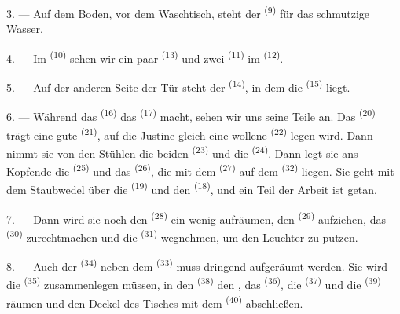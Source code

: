 3. --- Auf dem Boden, vor dem Waschtisch, steht der 
\textsuperscript{(9)} für das schmutzige Wasser.

4. --- Im  \textsuperscript{(10)} sehen wir ein paar
 \textsuperscript{(13)} und zwei 
\textsuperscript{(11)} im  \textsuperscript{(12)}.

5. --- Auf der anderen Seite der Tür steht der 
\textsuperscript{(14)}, in dem die  \textsuperscript{(15)} liegt.

6. --- Während das  \textsuperscript{(16)} das 
\textsuperscript{(17)} macht, sehen wir uns seine Teile an. Das 
\textsuperscript{(20)} trägt eine gute 
\textsuperscript{(21)}, auf die Justine gleich eine wollene 
\textsuperscript{(22)} legen wird. Dann nimmt sie von den Stühlen die beiden
 \textsuperscript{(23)} und die  \textsuperscript{(24)}.
Dann legt sie ans Kopfende die  \textsuperscript{(25)} und das
 \textsuperscript{(26)}, die mit dem 
\textsuperscript{(27)} auf dem  \textsuperscript{(32)} liegen.
Sie geht mit dem Staubwedel über die  \textsuperscript{(19)} und den
 \textsuperscript{(18)}, und ein Teil der Arbeit ist getan.

7. --- Dann wird sie noch den  \textsuperscript{(28)} ein wenig
aufräumen, den  \textsuperscript{(29)} aufziehen, das
 \textsuperscript{(30)} zurechtmachen und die 
\textsuperscript{(31)} wegnehmen, um den Leuchter zu putzen.

\VUsaut{5.0mm}
\VUsaut{3.0mm}

8. --- Auch der  \textsuperscript{(34)} neben dem 
\textsuperscript{(33)} muss dringend aufgeräumt werden. Sie wird die
 \textsuperscript{(35)} zusammenlegen müssen, in den
 \textsuperscript{(38)} den , das 
\textsuperscript{(36)}, die  \textsuperscript{(37)} und die
 \textsuperscript{(39)} räumen und den Deckel des Tisches mit dem
 \textsuperscript{(40)} abschließen.

